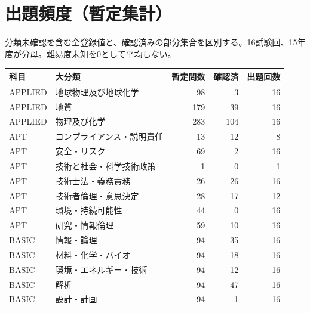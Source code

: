 \chapter{出題頻度（暫定集計）}
分類未確認を含む全登録値と、確認済みの部分集合を区別する。16試験回、15年度が分母。難易度未知を0として平均しない。
\begin{longtable}{p{.16\linewidth}p{.42\linewidth}rrr}
科目 & 大分類 & 暫定問数 & 確認済 & 出題回数\\\hline
APPLIED & 地球物理及び地球化学 & 98 & 3 & 16\\
APPLIED & 地質 & 179 & 39 & 16\\
APPLIED & 物理及び化学 & 283 & 104 & 16\\
APT & コンプライアンス・説明責任 & 13 & 12 & 8\\
APT & 安全・リスク & 69 & 2 & 16\\
APT & 技術と社会・科学技術政策 & 1 & 0 & 1\\
APT & 技術士法・義務責務 & 26 & 26 & 16\\
APT & 技術者倫理・意思決定 & 28 & 17 & 12\\
APT & 環境・持続可能性 & 44 & 0 & 16\\
APT & 研究・情報倫理 & 59 & 10 & 16\\
BASIC & 情報・論理 & 94 & 35 & 16\\
BASIC & 材料・化学・バイオ & 94 & 18 & 16\\
BASIC & 環境・エネルギー・技術 & 94 & 12 & 16\\
BASIC & 解析 & 94 & 47 & 16\\
BASIC & 設計・計画 & 94 & 1 & 16\\
\end{longtable}
